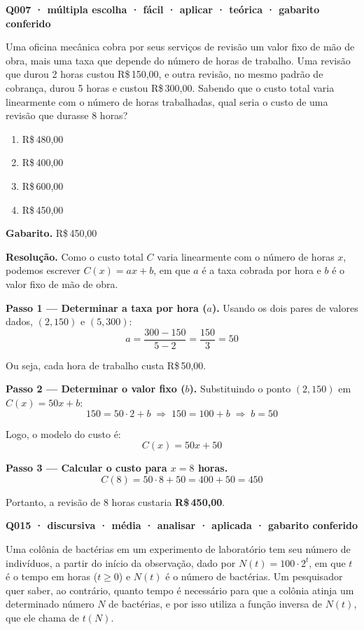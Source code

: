 \begingroup\sloppy\setlength{\parindent}{0pt}\setlength{\parskip}{0.5em}
\bigskip\noindent\textbf{Q007 · múltipla escolha · fácil · aplicar · teórica · gabarito conferido}\par\nopagebreak
Uma oficina mecânica cobra por seus serviços de revisão um valor fixo de mão de obra, mais uma taxa que depende do número de horas de trabalho. Uma revisão que durou 2 horas custou R\$\,150,00, e outra revisão, no mesmo padrão de cobrança, durou 5 horas e custou R\$\,300,00. Sabendo que o custo total varia linearmente com o número de horas trabalhadas, qual seria o custo de uma revisão que durasse 8 horas?
\begin{enumerate}[label=(\alph*)]
\item R\$\,480,00
\item R\$\,400,00
\item R\$\,600,00
\item R\$\,450,00
\end{enumerate}

\textbf{Gabarito.} R\$\,450,00

\textbf{Resolução.} Como o custo total $C$ varia linearmente com o número de horas $x$, podemos escrever $C(x) = ax + b$, em que $a$ é a taxa cobrada por hora e $b$ é o valor fixo de mão de obra.

\textbf{Passo 1 — Determinar a taxa por hora ($a$).}
Usando os dois pares de valores dados, $(2, 150)$ e $(5, 300)$:
$$a = \frac{300 - 150}{5 - 2} = \frac{150}{3} = 50$$

Ou seja, cada hora de trabalho custa R\$\,50,00.

\textbf{Passo 2 — Determinar o valor fixo ($b$).}
Substituindo o ponto $(2, 150)$ em $C(x) = 50x + b$:
$$150 = 50 \cdot 2 + b \;\Rightarrow\; 150 = 100 + b \;\Rightarrow\; b = 50$$

Logo, o modelo do custo é:
$$C(x) = 50x + 50$$

\textbf{Passo 3 — Calcular o custo para $x = 8$ horas.}
$$C(8) = 50 \cdot 8 + 50 = 400 + 50 = 450$$

Portanto, a revisão de 8 horas custaria \textbf{R\$\,450,00}.

\bigskip\noindent\textbf{Q015 · discursiva · média · analisar · aplicada · gabarito conferido}\par\nopagebreak
Uma colônia de bactérias em um experimento de laboratório tem seu número de indivíduos, a partir do início da observação, dado por $N(t) = 100 \cdot 2^{t}$, em que $t$ é o tempo em horas ($t \geq 0$) e $N(t)$ é o número de bactérias. Um pesquisador quer saber, ao contrário, quanto tempo é necessário para que a colônia atinja um determinado número $N$ de bactérias, e por isso utiliza a função inversa de $N(t)$, que ele chama de $t(N)$.

